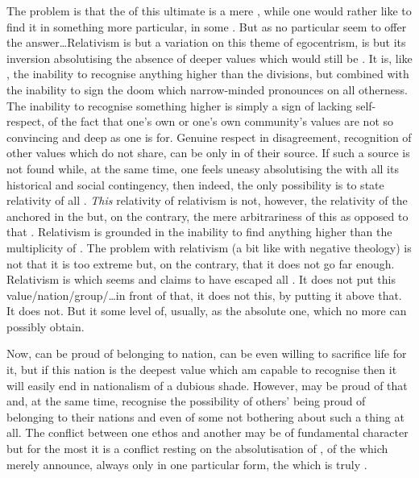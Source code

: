 \pa\label{pa:relativism} The problem is that the  of this ultimate
 is a mere , while one would rather like to find it in
something more particular, in some  . But as no particular
 seem to offer the answer\ldots  Relativism is but a variation on this
theme of egocentrism, is but its inversion absolutising the absence of deeper
values which would still be . It is, like , the
inability to recognise anything higher than the  divisions, but
combined with the inability to sign the doom which narrow-minded
 pronounces on all otherness. The inability to recognise
something higher is simply a sign of lacking self-respect, of the fact that
one's own or one's own community's values are not so convincing and deep as
 one is  for.  Genuine respect in disagreement,
recognition of other values which  do not share, can be  only
in  of their source. If such a source is not found while, at the
same time, one feels uneasy absolutising the  with all its historical
and social contingency, then indeed, the only possibility is to state relativity
of all . {\em This} relativity of relativism is not, however,
the relativity of the  anchored in the  but,
on the contrary, the mere arbitrariness of this  as opposed to that
. Relativism is grounded in the inability to find anything higher than
the multiplicity of .  The problem with relativism (a bit like
with negative theology) is not that it is too extreme but, on the contrary, that
it does not go far enough. Relativism is  which seems and claims to
have escaped all . It does not put this value/nation/group/\ldots in
front of that, it does not  this, by putting it above that. It does
not. But it  some level of, usually,  
 as the absolute one,  which no more  can
possibly obtain.

\pa
Now,  can be proud of belonging to  nation,  can be even willing
to sacrifice  life for it, but if this nation is the deepest value which
 am capable to recognise then it will easily end in
nationalism of a dubious shade. However,  may be proud of that and, at
the same time, recognise the possibility of others' being proud of belonging to
their nations and even of some not bothering about such a thing at all.  The
conflict between one ethos and another may be of fundamental character but for
the most it is a conflict resting on the absolutisation of , of the  which merely announce, always only in one
particular form, the  which is truly .

